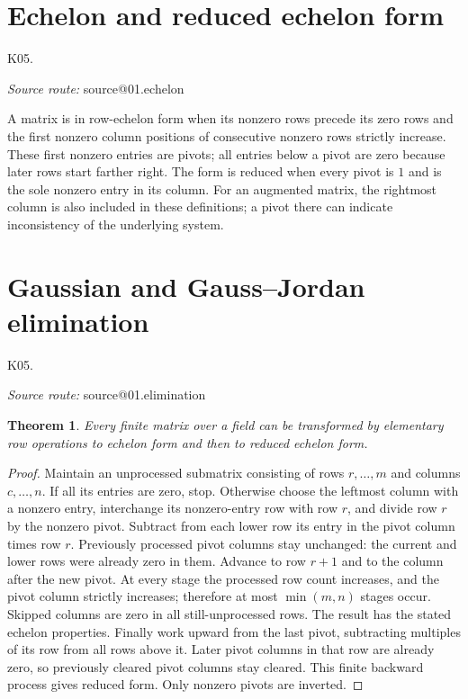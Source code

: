 \documentclass[11pt,a4paper]{book}
\makeatletter
\newtheorem{theorem}{Theorem}[chapter]
\theoremstyle{definition}\newtheorem{definition}[theorem]{Definition}
\theoremstyle{remark}\newtheorem{remark}[theorem]{Remark}
\newcommand{\Kentry}[2]{\section{#2}\label{k:#1}\noindent\textsf{\small K05.\detokenize{#1}}\par
  \begingroup\small\color{black!65}\textit{Source route: }\csname source@#1\endcsname\par\endgroup}
\makeatother
\begin{document}
\Kentry{01.echelon}{Echelon and reduced echelon form}
A matrix is in row-echelon form when its nonzero rows precede its zero rows and the first nonzero column positions of consecutive nonzero rows strictly increase. These first nonzero entries are pivots; all entries below a pivot are zero because later rows start farther right. The form is reduced when every pivot is $1$ and is the sole nonzero entry in its column. For an augmented matrix, the rightmost column is also included in these definitions; a pivot there can indicate inconsistency of the underlying system.

\Kentry{01.elimination}{Gaussian and Gauss--Jordan elimination}
\begin{theorem}
Every finite matrix over a field can be transformed by elementary row operations to echelon form and then to reduced echelon form.
\end{theorem}
\begin{proof}
Maintain an unprocessed submatrix consisting of rows $r,\ldots,m$ and columns $c,\ldots,n$. If all its entries are zero, stop. Otherwise choose the leftmost column with a nonzero entry, interchange its nonzero-entry row with row $r$, and divide row $r$ by the nonzero pivot. Subtract from each lower row its entry in the pivot column times row $r$. Previously processed pivot columns stay unchanged: the current and lower rows were already zero in them. Advance to row $r+1$ and to the column after the new pivot. At every stage the processed row count increases, and the pivot column strictly increases; therefore at most $\min(m,n)$ stages occur. Skipped columns are zero in all still-unprocessed rows. The result has the stated echelon properties. Finally work upward from the last pivot, subtracting multiples of its row from all rows above it. Later pivot columns in that row are already zero, so previously cleared pivot columns stay cleared. This finite backward process gives reduced form. Only nonzero pivots are inverted.
\end{proof}
\end{document}
